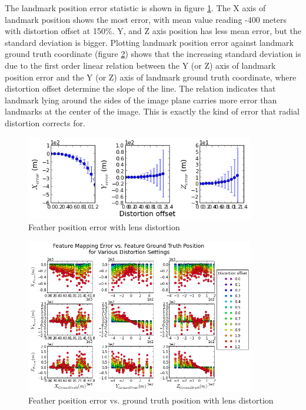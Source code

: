 The landmark position error statistic is shown in figure \ref{fig:simfig45}. The X axis of landmark position shows the most error, with mean value reading -400 meters with distortion offset at 150\%. Y, and Z axis position has less mean error, but the standard deviation is bigger. Plotting landmark position error against landmark ground truth coordinate (figure \ref{fig:simfig46}) shows that the increasing standard deviation is due to the first order linear relation between the Y (or Z) axis of landmark position error and the Y (or Z) axis of landmark ground truth coordinate, where distortion offset determine the slope of the line. The relation indicates that landmark lying around the sides of the image plane carries more error than landmarks at the center of the image. This is exactly the kind of error that radial distortion corrects for. 

\begin{figure}[h]
  \centering
  \includegraphics[width=10cm,keepaspectratio=true]{./Figures/SimulationFigures/Figure45.png}
  \caption{Feather position error with lens distortion}
  \label{fig:simfig45}
\end{figure}

\begin{figure}[h]
  \centering
  \includegraphics[width=10cm,keepaspectratio=true]{./Figures/SimulationFigures/Figure46.png}
  \caption{Feather position error vs. ground truth position with lens distortion}
  \label{fig:simfig46}
\end{figure}

